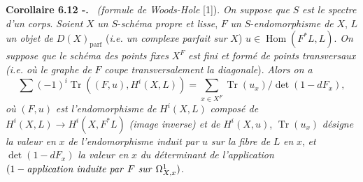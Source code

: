 \documentclass[11pt]{article}
\newenvironment{statement}[1]{\par\medskip\noindent\textbf{#1.}\ }{\par\medskip}
\DeclareMathOperator{\Hom}{Hom}
\providecommand{\parf}{\mathrm{parf}}
\providecommand{\Hom}{\operatorname{Hom}}
\providecommand{\parf}{\mathrm{parf}}
\providecommand{\Hom}{\operatorname{Hom}}
\begin{document}
\begin{statement}{Corollaire 6.12 -}
\emph{(formule de Woods-Hole} [1]). \emph{On suppose que} $S$ \emph{est le spectre d'un corps}. \emph{Soient} $X$ \emph{un} $S$-\emph{schéma propre et lisse}, $F$ \emph{un} $S$-\emph{endomorphisme de} $X$, $L$ \emph{un objet de} $D(X)_{\parf}$ (\emph{i.e. un complexe parfait sur} $X$) $u\in\Hom(F^*L,L)$. \emph{On suppose que le schéma des points fixes} $X^F$ \emph{est fini et formé de points transversaux (i.e. où le graphe de} $F$ \emph{coupe transversalement la diagonale}). \emph{Alors on a}
\[
\sum(-1)^i\operatorname{Tr}((F,u),H^i(X,L))=
\sum_{x\in X^F}\operatorname{Tr}(u_x)/\det(1-dF_x),
\]
\emph{où} $(F,u)$ \emph{est l'endomorphisme de} $H^i(X,L)$ \emph{composé de} $H^i(X,L)\to H^i(X,F^*L)$ 
\emph{(image inverse) et de} $H^i(X,u)$, $\operatorname{Tr}(u_x)$ \emph{désigne la}
\emph{valeur en} $x$ \emph{de l'endomorphisme induit par} $u$ \emph{sur la fibre de} $L$ \emph{en} $x$, \emph{et} $\det(1-dF_x)$ \emph{la valeur en} $x$ \emph{du déterminant de l'application} $(1-\text{\emph{application induite par} }F\text{ \emph{sur} }\Omega^1_{X,x})$.


\end{statement}
\end{document}
